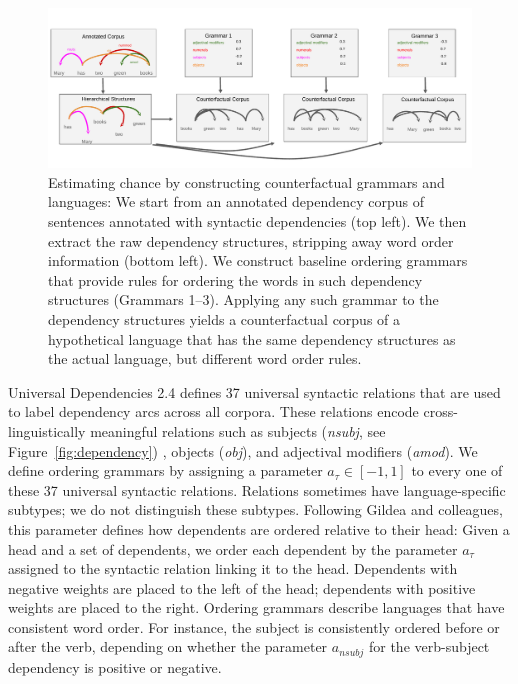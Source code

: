 \begin{figure}
\centering
\includegraphics[width=\textwidth]{figures-gdrive/counterfactual-languages.pdf}
\caption{Estimating chance by constructing counterfactual grammars and languages: We start from an annotated dependency corpus of sentences annotated with syntactic dependencies (top left). We then extract the raw dependency structures, stripping away word order information (bottom left).
We construct baseline ordering grammars that provide rules for ordering the words in such dependency structures (Grammars 1--3).
Applying any such grammar to the dependency structures yields a counterfactual corpus of a hypothetical language that has the same dependency structures as the actual language, but different word order rules.}\label{fig:grammars}
\end{figure}


Universal Dependencies 2.4 defines 37 universal syntactic relations that are used to label dependency arcs across all corpora.
These relations encode cross-linguistically meaningful relations such as subjects (\textit{nsubj}, see Figure~\ref{fig:dependency}) , objects (\textit{obj}), and adjectival modifiers (\textit{amod}).
We define ordering grammars by assigning a parameter $a_\tau \in [-1,1]$ to every one of these 37 universal syntactic relations.
Relations sometimes have language-specific subtypes; we do not distinguish these subtypes.
Following Gildea and colleagues, this parameter defines how dependents are ordered relative to their head:
Given a head and a set of dependents, we order each dependent by the parameter $a_\tau$ assigned to the syntactic relation linking it to the head.
Dependents with negative weights are placed to the left of the head; dependents with positive weights are placed to the right. Ordering grammars describe languages that have consistent word order.
For instance, the subject is consistently ordered before or after the verb, depending on whether the parameter $a_{nsubj}$ for the verb-subject dependency is positive or negative.

